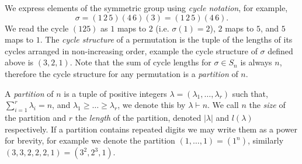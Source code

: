 \documentclass[11pt]{report}
\begin{document}
We express elements of the symmetric group using \emph{cycle notation}, for example,
\[\sigma = (1\,2\,5)(4\,6)(3) = (1\,2\,5)(4\,6) .\]
We read the cycle $(125)$ as $1$ maps to $2$ (i.e. $\sigma(1) =2$), $2$ maps to $5$, and $5$ maps to $1$. The \emph{cycle structure} of a permutation is the tuple of the lengths of its cycles arranged in non-increasing order, example the cycle structure of $\sigma$ defined above is $(3,2,1)$.  Note that the sum of cycle lengths for $\sigma \in S_{n}$ is always $n$, therefore the cycle structure for any permutation is a \emph{partition} of $n$.

\begin{defn}
	A \emph{partition} of $n$ is a tuple of positive integers $\lambda = (\lambda_{1}, \dots, 
	\lambda_{r})$ such that, $\sum_{i=1}^{r} \lambda_{i} =n$, and $\lambda_{1} \geq \dots 
	\geq \lambda_{r}$, we denote this by $\lambda \vdash n$. We call $n$ the \emph{size} of the partition and $r$ the \emph{length} of the partition, denoted $|\lambda|$ and $l(\lambda)$ respectively. If a partition contains repeated digits we may write them as a power for 
	brevity, for example we denote the 	partition $(1,\dots,1) = (1^{n})$, similarly 	$(3,3,2,2,2,1) = (3^{2},2^{3}, 1)$. 
\end{defn}
\end{document}
